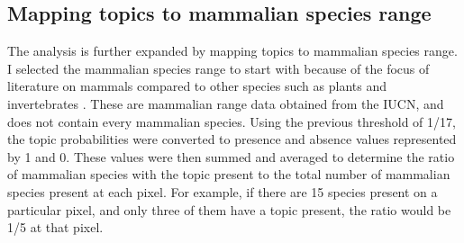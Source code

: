 \subsection{Mapping topics to mammalian species range}

The analysis is further expanded by mapping topics to mammalian species range. I selected the mammalian species range to start with because of the focus of literature on mammals \parencite{cardillo2008predictability,gonzalez2013intrinsic,purvis2000predicting} compared to other species such as plants \parencite{stefanaki2015lessons,powney2014phylogenetically,sodhi2008correlates} and invertebrates \parencite{arbetman2017global,koh2004ecological,sullivan2000comparative}. These are mammalian range data obtained from the IUCN, and does not contain every mammalian species. Using the previous threshold of 1/17, the topic probabilities were converted to presence and absence values represented by 1 and 0. These values were then summed and averaged to determine the ratio of mammalian species with the topic present to the total number of mammalian species present at each pixel. For example, if there are 15 species present on a particular pixel, and only three of them have a topic present, the ratio would be 1/5 at that pixel.
